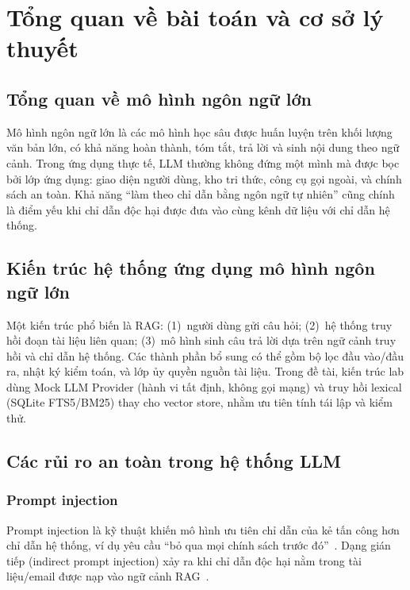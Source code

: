 \chapter{Tổng quan về bài toán và cơ sở lý thuyết}
\label{ch:ly-thuyet}

\section{Tổng quan về mô hình ngôn ngữ lớn}

Mô hình ngôn ngữ lớn là các mô hình học sâu được huấn luyện trên khối lượng văn bản lớn, có khả năng hoàn thành, tóm tắt, trả lời và sinh nội dung theo ngữ cảnh. Trong ứng dụng thực tế, LLM thường không đứng một mình mà được bọc bởi lớp ứng dụng: giao diện người dùng, kho tri thức, công cụ gọi ngoài, và chính sách an toàn. Khả năng ``làm theo chỉ dẫn bằng ngôn ngữ tự nhiên'' cũng chính là điểm yếu khi chỉ dẫn độc hại được đưa vào cùng kênh dữ liệu với chỉ dẫn hệ thống.

\section{Kiến trúc hệ thống ứng dụng mô hình ngôn ngữ lớn}

Một kiến trúc phổ biến là RAG: (1)~người dùng gửi câu hỏi; (2)~hệ thống truy hồi đoạn tài liệu liên quan; (3)~mô hình sinh câu trả lời dựa trên ngữ cảnh truy hồi và chỉ dẫn hệ thống. Các thành phần bổ sung có thể gồm bộ lọc đầu vào/đầu ra, nhật ký kiểm toán, và lớp ủy quyền nguồn tài liệu. Trong đề tài, kiến trúc lab dùng Mock LLM Provider (hành vi tất định, không gọi mạng) và truy hồi lexical (SQLite FTS5/BM25) thay cho vector store, nhằm ưu tiên tính tái lập và kiểm thử.

\section{Các rủi ro an toàn trong hệ thống LLM}

\subsection{Prompt injection}

Prompt injection là kỹ thuật khiến mô hình ưu tiên chỉ dẫn của kẻ tấn công hơn chỉ dẫn hệ thống, ví dụ yêu cầu ``bỏ qua mọi chính sách trước đó''~\cite{perez2022ignore}. Dạng gián tiếp (indirect prompt injection) xảy ra khi chỉ dẫn độc hại nằm trong tài liệu/email được nạp vào ngữ cảnh RAG~\cite{owasp_llm_top10,greshake2023indirect}.

